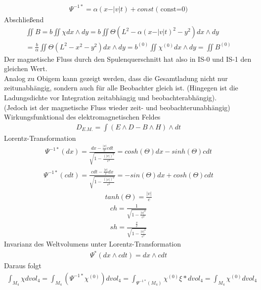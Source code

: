 \documentclass[10pt,a4paper]{article}
\begin{document}
\begin{align}
\Psi^{-1*}= \alpha ( x - \vert v \vert t ) + const \;\text{( const=0)}
\end{align}
Abschließend
\begin{align}
\iint B = b \iint \chi dx \wedge dy = b \iint \Theta (L^2- \alpha (x- \vert v \vert t)^2-y^2)dx \wedge dy\\ = \frac{b}{\alpha} \iint \Theta (L^2-x^2-y^2) dx \wedge dy = b^{(0)} \iint \chi^{(0)} dx \wedge dy = \iint B^{(0)}
\end{align}
Der magnetische Fluss durch den Spulenquerschnitt hat also in IS-0 und IS-1 den gleichen Wert. \\
Analog zu Obigem kann gezeigt werden, dass die Gesamtladung nicht nur zeitunabhängig, sondern auch für alle Beobachter gleich ist. (Hingegen ist die Ladungsdichte vor Integration zeitabhängig und beobachterabhängig).\\
(Jedoch ist der magnetische Fluss wieder zeit- und beobachterunabhängig)\\
Wirkungsfunktional des elektromagnetischen Feldes
\begin{align}
D_{E.M.} = \int (E \wedge D - B \wedge H) \wedge dt
\end{align}
Lorentz-Transformation
\begin{align}
\Psi^{-1*} (dx) =\frac{dx- \frac{\vert v \vert}{c} cdt}{\sqrt{1-\frac{(\vert v \vert)^2}{c^2}}} = cosh(\Theta) dx - sinh (\Theta) cdt
\end{align}
\begin{align}
\Psi ^{-1*} (cdt)= \frac{cdt- \frac{\vert v \vert}{c}dx}{\sqrt{1- \frac{(\vert v \vert)^2}{c^2}}}=-sin(\Theta) dx + cosh(\Theta) cdt
\end{align}
\begin{align}
tanh(\Theta)= \frac{\vert v \vert}{c}
\end{align}
\begin{align}
ch=\frac{1}{\sqrt{1-\frac{\vert v \vert^2}{c^2}}}
\end{align}
\begin{align}
sh=\frac{\frac{v}{c}}{\sqrt{1-\frac{\vert v \vert^2}{c^2}}}
\end{align}
Invarianz des Weltvolumens unter Lorentz-Transformation
\begin{align}
\Psi^* (dx \wedge cdt) = dx \wedge cdt
\end{align}
Daraus folgt
\begin{align}
\int_{M_4} \chi dvol_4 = \int_{M_4}  ( \Psi^{-1*} \chi^{(0)}) dvol_4 = \int_{ \Psi^{-1*} (M_4)} \chi^{(0)} \xi* dvol_4 = \int_{M_4} \chi^{(0)} dvol_4 
\end{align}
\end{document}
